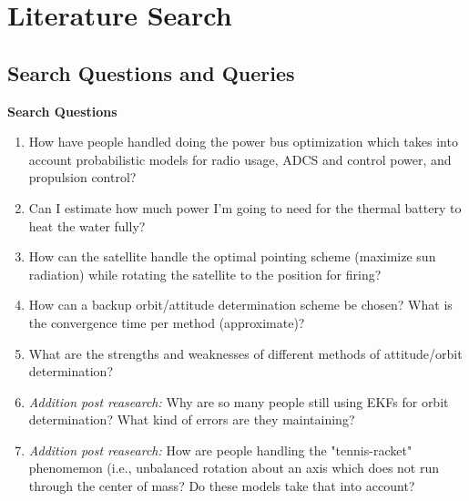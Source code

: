 
\section{Literature Search}

\subsection{Search Questions and Queries}
\textbf{Search Questions}
\begin{enumerate}
    \item How have people handled doing the power bus optimization which takes into account probabilistic models for radio usage, ADCS and control power, and propulsion control?
    \item Can I estimate how much power I'm going to need for the thermal battery to heat the water fully?
    \item How can the satellite handle the optimal pointing scheme (maximize sun radiation) while rotating the satellite to the position for firing?
    \item How can a backup orbit/attitude determination scheme be chosen? What is the convergence time per method (approximate)?
    \item What are the strengths and weaknesses of different methods of attitude/orbit determination?
    \item \textit{Addition post reasearch:} Why are so many people still using EKFs for orbit determination? What kind of errors are they maintaining?
    \item \textit{Addition post reasearch:} How are people handling the "tennis-racket" phenomemon (i.e., unbalanced rotation about an axis which does not run through the center of mass? Do these models take that into account?
\end{enumerate}

